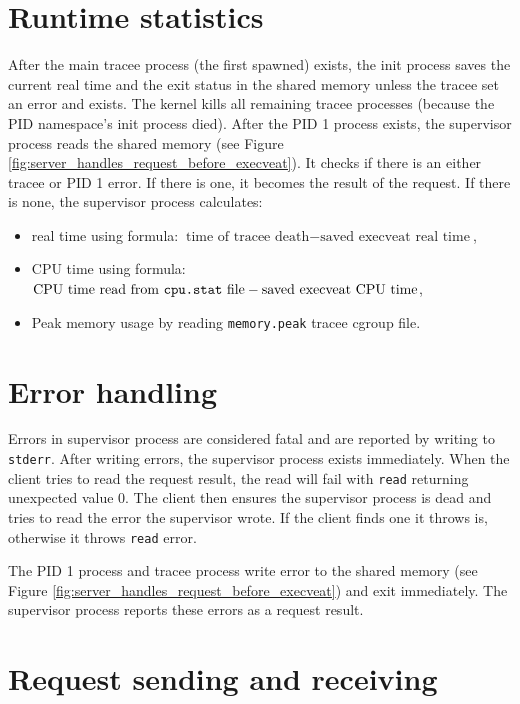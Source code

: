 \documentclass[en]{pracamgr}
\begin{document}
\section{Runtime statistics}

After the main tracee process (the first spawned) exists, the init process saves the current real time and the exit status in the shared memory unless the tracee set an error and exists. The kernel kills all remaining tracee processes (because the PID namespace's init process died). After the PID 1 process exists, the supervisor process reads the shared memory (see Figure \ref{fig:server_handles_request_before_execveat}). It checks if there is an either tracee or PID 1 error. If there is one, it becomes the result of the request. If there is none, the supervisor process calculates:
\begin{itemize}
    \item real time using formula: $\text{time of tracee death} - \text{saved execveat real time}$,
    \item CPU time using formula: $\text{CPU time read from \texttt{cpu.stat} file} - \text{saved execveat CPU time}$,
    \item Peak memory usage by reading \texttt{memory.peak} tracee cgroup file.
\end{itemize}

\section{Error handling}

Errors in supervisor process are considered fatal and are reported by writing to \texttt{stderr}. After writing errors, the supervisor process exists immediately. When the client tries to read the request result, the read will fail with \texttt{read} returning unexpected value 0. The client then ensures the supervisor process is dead and tries to read the error the supervisor wrote. If the client finds one it throws is, otherwise it throws \texttt{read} error.

The PID 1 process and tracee process write error to the shared memory (see Figure \ref{fig:server_handles_request_before_execveat}) and exit immediately. The supervisor process reports these errors as a request result.

\section{Request sending and receiving}
\end{document}
